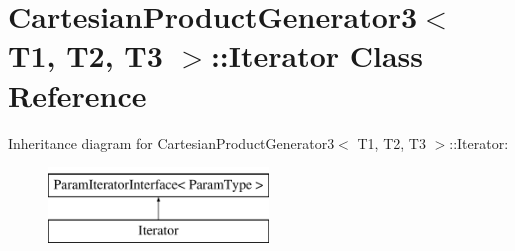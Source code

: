 \hypertarget{classtesting_1_1internal_1_1CartesianProductGenerator3_1_1Iterator}{\section{\-Cartesian\-Product\-Generator3$<$ \-T1, \-T2, \-T3 $>$\-:\-:\-Iterator \-Class \-Reference}
\label{dd/dcf/classtesting_1_1internal_1_1CartesianProductGenerator3_1_1Iterator}
}
\-Inheritance diagram for \-Cartesian\-Product\-Generator3$<$ \-T1, \-T2, \-T3 $>$\-:\-:\-Iterator\-:\begin{figure}[H]
\begin{center}
\leavevmode
\includegraphics[height=2.000000cm]{dd/dcf/classtesting_1_1internal_1_1CartesianProductGenerator3_1_1Iterator}
\end{center}
\end{figure}
